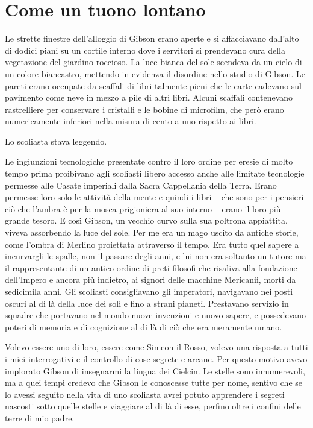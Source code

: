 \chapter{Come un tuono lontano}

Le strette finestre dell'alloggio di Gibson erano aperte e si
affacciavano dall'alto di dodici piani su un cortile interno dove i
servitori si prendevano cura della vegetazione del giardino roccioso. La
luce bianca del sole scendeva da un cielo di un colore biancastro,
mettendo in evidenza il disordine nello studio di Gibson. Le pareti
erano occupate da scaffali di libri talmente pieni che le carte cadevano
sul pavimento come neve in mezzo a pile di altri libri. Alcuni scaffali
contenevano rastrelliere per conservare i cristalli e le bobine di
microfilm, che però erano numericamente inferiori nella misura di cento
a uno rispetto ai libri.

Lo scoliasta stava leggendo.

Le ingiunzioni tecnologiche presentate contro il loro ordine per eresie
di molto tempo prima proibivano agli scoliasti libero accesso anche alle
limitate tecnologie permesse alle Casate imperiali dalla Sacra
Cappellania della Terra. Erano permesse loro solo le attività della
mente e quindi i libri -- che sono per i pensieri ciò che l'ambra è per
la mosca prigioniera al suo interno -- erano il loro più grande tesoro.
E così Gibson, un vecchio curvo sulla sua poltrona appiattita, viveva
assorbendo la luce del sole. Per me era un mago uscito da antiche
storie, come l'ombra di Merlino proiettata attraverso il tempo. Era
tutto quel sapere a incurvargli le spalle, non il passare degli anni, e
lui non era soltanto un tutore ma il rappresentante di un antico ordine
di preti-filosofi che risaliva alla fondazione dell'Impero e ancora più
indietro, ai signori delle macchine Mericanii, morti da sedicimila anni.
Gli scoliasti consigliavano gli {imperatori}, navigavano nei posti
oscuri al di là della luce dei soli e fino a strani pianeti. Prestavano
servizio in squadre che portavano nel mondo nuove invenzioni e nuovo
sapere, e possedevano poteri di memoria e di cognizione al di là di ciò
che era meramente umano.

Volevo essere uno di loro, essere come Simeon il Rosso, volevo una
risposta a tutti i miei interrogativi e il controllo di cose segrete e
arcane. Per questo motivo avevo implorato Gibson di insegnarmi la lingua
dei Cielcin. Le stelle sono innumerevoli, ma a quei tempi credevo che
Gibson le conoscesse tutte per nome, sentivo che se lo avessi seguito
nella vita di uno scoliasta avrei potuto apprendere i segreti nascosti
sotto quelle stelle e viaggiare al di là di esse, perfino oltre i
confini delle terre di mio padre.


